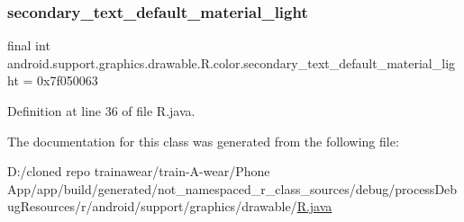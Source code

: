 \subsubsection{\texorpdfstring{secondary\_text\_default\_material\_light}{secondary\_text\_default\_material\_light}}
{\footnotesize\ttfamily final int android.\+support.\+graphics.\+drawable.\+R.\+color.\+secondary\+\_\+text\+\_\+default\+\_\+material\+\_\+light = 0x7f050063\hspace{0.3cm}{\ttfamily [static]}}



Definition at line 36 of file R.\+java.



The documentation for this class was generated from the following file\+:\begin{DoxyCompactItemize}
\item 
D\+:/cloned repo trainawear/train-\/\+A-\/wear/\+Phone App/app/build/generated/not\+\_\+namespaced\+\_\+r\+\_\+class\+\_\+sources/debug/process\+Debug\+Resources/r/android/support/graphics/drawable/\mbox{\hyperlink{process_debug_resources_2r_2android_2support_2graphics_2drawable_2_r_8java}{R.\+java}}\end{DoxyCompactItemize}
